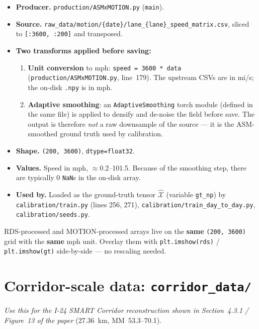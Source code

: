 \documentclass[11pt]{article}
\newcommand{\code}[1]{\texttt{#1}}
\newcommand{\nan}{\code{NaN}}
\newcommand{\filename}[1]{\textcolor{accent}{\code{#1}}}
\begin{document}
\begin{itemize}[leftmargin=*]
  \item \textbf{Producer.} \filename{production/ASMxMOTION.py} (\code{main}).
  \item \textbf{Source.}
    \filename{raw\_data/motion/\{date\}/lane\_\{lane\}\_speed\_matrix.csv},
    sliced to \code{[:3600, :200]} and transposed.
  \item \textbf{Two transforms applied before saving:}
    \begin{enumerate}
      \item \textbf{Unit conversion} to mph: \code{speed = 3600 * data}
        (\filename{production/ASMxMOTION.py}, line~179). The upstream CSVs
        are in mi/s; the on-disk \code{.npy} is in mph.
      \item \textbf{Adaptive smoothing}: an \code{AdaptiveSmoothing} torch
        module (defined in the same file) is applied to densify and de-noise
        the field before save. The output is therefore \emph{not} a raw
        downsample of the source --- it is the ASM-smoothed ground truth used
        by calibration.
    \end{enumerate}
  \item \textbf{Shape.} \code{(200, 3600)}, \code{dtype=float32}.
  \item \textbf{Values.} Speed in mph, $\approx$0.2--101.5. Because of the
    smoothing step, there are typically 0 \nan{}s in the on-disk array.
  \item \textbf{Used by.} Loaded as the ground-truth tensor
    $\hat{\mathcal{X}}$ (variable \code{gt\_np}) by
    \code{calibration/train.py} (lines 256, 271),
    \code{calibration/train\_day\_to\_day.py},
    \code{calibration/seeds.py}.
\end{itemize}

\begin{tipbox}
RDS-processed and MOTION-processed arrays live on the \textbf{same}
\code{(200, 3600)} grid with the \textbf{same} mph unit. Overlay them with
\code{plt.imshow(rds)} / \code{plt.imshow(gt)} side-by-side --- no rescaling
needed.
\end{tipbox}

\section{Corridor-scale data: \texttt{corridor\_data/}}
\label{sec:corridor}

\emph{Use this for the I-24 SMART Corridor reconstruction shown in
Section~4.3.1 / Figure~13 of the paper} (27.36~km, MM~53.3--70.1).
\end{document}
